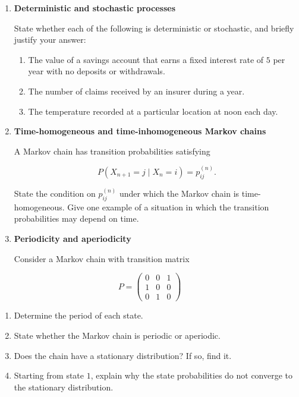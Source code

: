 \documentclass[
  letterpaper,
  DIV=11,
  numbers=noendperiod]{scrartcl}
\begin{document}
\begin{enumerate}
\def\labelenumi{\arabic{enumi}.}
\item
  \textbf{Deterministic and stochastic processes}

  State whether each of the following is deterministic or stochastic,
  and briefly justify your answer:

  \begin{enumerate}
  \def\labelenumii{\alph{enumii}.}
  \item
    The value of a savings account that earns a fixed interest rate of
    \(5%
    \) per year with no deposits or withdrawals.
  \item
    The number of claims received by an insurer during a year.
  \item
    The temperature recorded at a particular location at noon each day.
  \end{enumerate}
\item
  \textbf{Time-homogeneous and time-inhomogeneous Markov chains}

  A Markov chain has transition probabilities satisfying

  \[
  P(X_{n+1}=j\mid X_n=i)=p_{ij}^{(n)}.
  \]

  State the condition on \(p_{ij}^{(n)}\) under which the Markov chain
  is time-homogeneous. Give one example of a situation in which the
  transition probabilities may depend on time.
\item
  \textbf{Periodicity and aperiodicity}

  Consider a Markov chain with transition matrix
\end{enumerate}

\[
  P=
  \begin{pmatrix}
  0 & 0 & 1\\
  1 & 0 & 0\\
  0 & 1 & 0
  \end{pmatrix}
  \]

\begin{enumerate}
\def\labelenumi{\alph{enumi}.}
\item
  Determine the period of each state.
\item
  State whether the Markov chain is periodic or aperiodic.
\item
  Does the chain have a stationary distribution? If so, find it.
\item
  Starting from state \(1\), explain why the state probabilities do not
  converge to the stationary distribution.
\end{enumerate}
\end{document}
